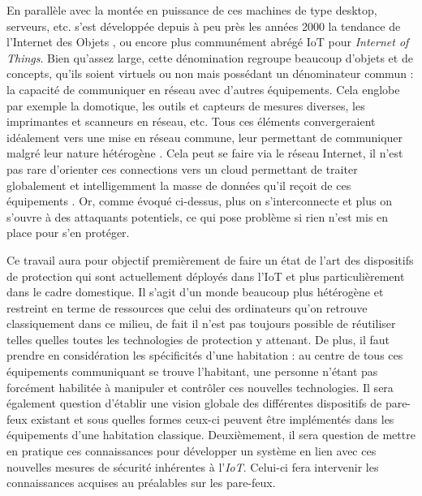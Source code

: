 \documentclass[]{article}
\begin{document}
\par En parallèle avec la montée en puissance de ces machines de type desktop, serveurs, etc. s'est développée depuis à peu près les années 2000 la tendance de l'\og Internet des Objets \fg{}, ou encore plus communément abrégé IoT pour \textit{Internet of Things}. Bien qu'assez large, cette dénomination regroupe beaucoup d'objets et de concepts, qu'ils soient virtuels ou non mais possédant un dénominateur commun : la capacité de communiquer en réseau avec d'autres équipements. Cela englobe par exemple la domotique, les outils et capteurs de mesures diverses, les imprimantes et scanneurs en réseau, etc. Tous ces éléments convergeraient idéalement vers une mise en réseau commune, leur permettant de communiquer malgré leur nature hétérogène \cite{Kubler2014}. Cela peut se faire via le réseau Internet, il n'est pas rare d'orienter ces connections vers un cloud permettant de traiter globalement et intelligemment la masse de données qu'il reçoit de ces équipements \cite{Huichen2016}. Or, comme évoqué ci-dessus, plus on s'interconnecte et plus on s'ouvre à des attaquants potentiels, ce qui pose problème si rien n'est mis en place pour s'en protéger.\\

\par Ce travail aura pour objectif premièrement de faire un état de l'art des dispositifs de protection qui sont actuellement déployés dans l'IoT et plus particulièrement dans le cadre domestique. Il s'agit d'un monde beaucoup plus hétérogène et restreint en terme de ressources que celui des ordinateurs qu'on retrouve classiquement dans ce milieu, de fait il n'est pas toujours possible de réutiliser telles quelles toutes les technologies de protection y attenant. De plus, il faut prendre en considération les spécificités d'une habitation : au centre de tous ces équipements communiquant se trouve l'habitant, une personne n'étant pas forcément habilitée à manipuler et contrôler ces nouvelles technologies. Il sera également question d'établir une vision globale des différentes dispositifs de pare-feux existant et sous quelles formes ceux-ci peuvent être implémentés dans les équipements d'une habitation classique. Deuxièmement, il sera question de mettre en pratique ces connaissances pour développer un système en lien avec ces nouvelles mesures de sécurité inhérentes à l'\textit{IoT}. Celui-ci fera intervenir les connaissances acquises au préalables sur les pare-feux.
\newpage
\end{document}
